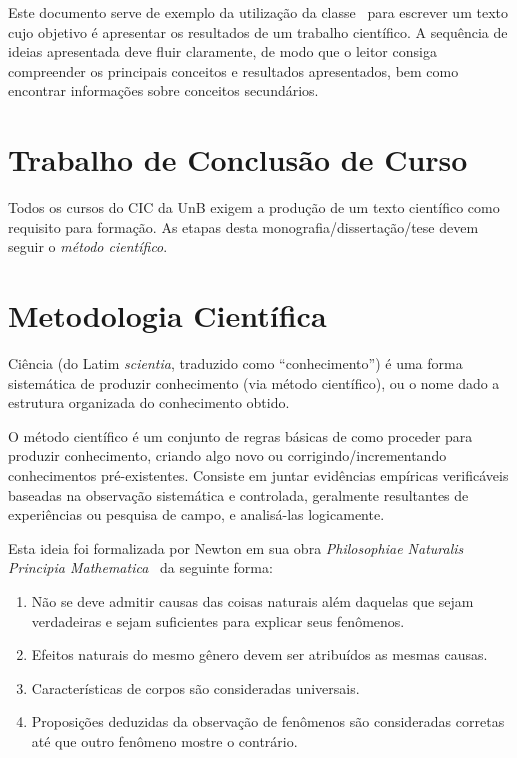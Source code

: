 Este documento serve de exemplo da utilização da classe \unbcic\ para escrever
um texto cujo objetivo é apresentar os resultados de um trabalho científico. A
sequência de ideias apresentada deve fluir claramente, de modo que o leitor
consiga compreender os principais conceitos e resultados apresentados, bem como
encontrar informações sobre conceitos secundários.


\section{Trabalho de Conclusão de Curso}%
Todos os cursos do \acrfull{CIC} da \acrfull{UnB} exigem a produção de um
texto científico como requisito para formação. %
As etapas desta monografia/dissertação/tese devem seguir o \emph{método científico}.

\section{Metodologia Científica}%
Ciência (do Latim \emph{scientia}, traduzido como ``conhecimento'') é uma forma
sistemática de produzir conhecimento (via método científico), ou o nome dado a
estrutura organizada do conhecimento obtido.

O método científico é um conjunto de regras básicas de como proceder para produzir
conhecimento, criando algo novo ou corrigindo/incrementando conhecimentos 
pré-existentes. Consiste em juntar evidências empíricas verificáveis baseadas na
observação sistemática e controlada, geralmente resultantes de experiências ou
pesquisa de campo, e analisá-las logicamente.

Esta ideia foi formalizada por Newton em sua obra \emph{Philosophiae Naturalis
Principia Mathematica}~\cite{newton1833philosophiae} da seguinte forma:
\begin{enumerate}
	\item Não se deve admitir causas das coisas naturais além daquelas
	que sejam verdadeiras e sejam suficientes para explicar seus fenômenos.
	\item Efeitos naturais do mesmo gênero devem ser atribuídos as mesmas causas.
	\item Características de corpos são consideradas universais.
	\item Proposições deduzidas da observação de fenômenos são
	consideradas corretas até que outro fenômeno mostre o contrário.
\end{enumerate}%

